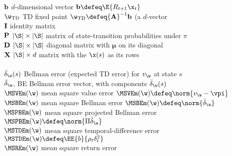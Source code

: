 \begin{tabbing}
\>${\bf b}$           \> $d$-dimensional vector ${\bf b}\defeq\E{R_{t+1}\x_t}$\\
\>$\w_{\rm TD}$       \> TD fixed point $\w_{\rm TD}\defeq {\bf A}^{-1}{\bf b}$ (a $d$-vector\\
\>${\bf I}$           \> identity matrix\\
\>${\bf P}$           \> $|\S|\times |\S|$ matrix of state-transition probabilities under $\pi$\\
\>${\bf D}$           \> $|\S|\times |\S|$ diagonal matrix with $\bm\mu$ on its diagonal\\
\>${\bf X}$           \> $|\S|\times d$ matrix with the $\x(s)$ as its rows\\
\\
\>$\bar\delta_\w(s)$  \> Bellman error (expected TD error) for $v_\w$ at state $s$\\
\>$\bar\delta_\w$, BE \> Bellman error vector, with components $\bar\delta_\w(s)$\\
\>$\MSVEm(\w)$        \> mean square value error $\MSVEm(\w)\defeq\norm{v_\w-\vpi}$\\
\>$\MSBEm(\w)$        \> mean square Bellman error $\MSBEm(\w)\defeq\norm{\bar\delta_\w}$\\
\>$\MSPBEm(\w)$       \> mean square projected Bellman error $\MSPBEm(\w)\defeq\norm{\Pi\bar\delta_\w}$\\
\>$\MSTDEm(\w)$       \> mean square temporal-difference error $\MSTDEm(\w)\defeq\EE{b}{\rho_t\delta_t^2}$ \\
\>$\MSREm(\w)$        \> mean square return error\\
\end{tabbing}
